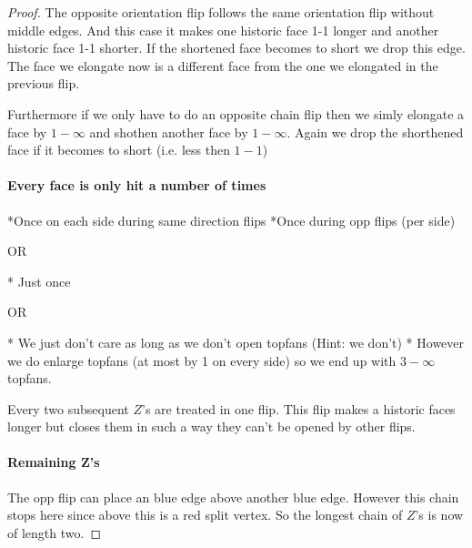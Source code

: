 \begin{proof}
  The opposite orientation flip follows the same orientation flip without middle edges. And this case it makes one historic face 1-1 longer and another historic face 1-1 shorter. If the shortened face becomes to short we drop this edge.
  The face we elongate now is a different face from the one we elongated in the previous flip.

  Furthermore if we only have to do an opposite chain flip then we simly elongate a face by $1-\infty$ and shothen another face by $1-\infty$. Again we drop the shorthened face if it becomes to short (i.e. less then $1-1$)

  \paragraph{Every face is only hit a number of times}
  *Once on each side during same direction flips
  *Once during opp flips (per side)

  OR

  * Just once

  OR

  * We just don't care as long as we don't open topfans (Hint: we don't)
  * However we do enlarge topfans (at most by 1 on every side) so we end up with $3-\infty$ topfans.

  Every two subsequent $Z$'s are treated in one flip. This flip makes a historic faces longer but closes them in such a way they can't be opened by other flips.

  \paragraph{Remaining Z's}
  The opp flip can place an blue edge above another blue edge. However this chain stops here since above this is a red split vertex. So the longest chain of $Z$'s is now of length two.
\end{proof}
